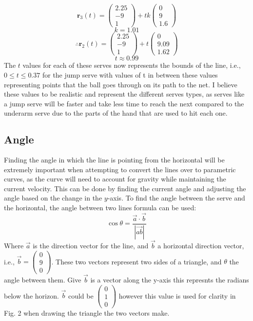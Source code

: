 \documentclass{article}
\begin{document}
										\[\mathbf{r}_3(t) = 
											\begin{pmatrix} 2.25 \\ -9 \\ 1 \end{pmatrix} 
											+ tk \begin{pmatrix} 0 \\ 9 \\ 1.6 \end{pmatrix}\]
											\[k = 1.01\]
											\[\therefore \mathbf{r}_2(t) = 
												\begin{pmatrix} 2.25 \\ -9 \\ 1 \end{pmatrix} 
												+ t \begin{pmatrix} 0 \\ 9.09 \\ 1.62 \end{pmatrix}\]
												\[t \approx 0.99\]
												The \(t\) values for each of these serves now represents the bounds of the line, i.e., \(0 \le t \le 0.37\) for the jump serve with values of t in between these values representing points that the ball goes through on its path to the net. I believe these values to be realistic and represent the different serves types, as serves like a jump serve will be faster and take less time to reach the next compared to the underarm serve due to the parts of the hand that are used to hit each one.


												\subsection*{Angle}

												Finding the angle in which the line is pointing from the horizontal will be extremely important when attempting to convert the lines over to parametric curves, as the curve will need to account for gravity while maintaining the current velocity. This can be done by finding the current angle and adjusting the angle based on the change in the \(y\)-axis. To find the angle between the serve and the horizontal, the angle between two lines formula can be used:
												\[\cos \theta = \frac{\vec{a} \cdot \vec{b}}{|\vec{ab}|}\]
												Where \(\vec{a}\) is the direction vector for the line, and \(\vec{b}\) a horizontal direction vector, i.e., \(\vec{b} = \begin{pmatrix} 0 \\ 9 \\ 0 \end{pmatrix}\). These two vectors represent two sides of a triangle, and \(\theta\) the angle between them. Give \(\vec{b}\) is a vector along the \(\mathrm{y}\)-axis this represnts the radians below the horizon. \(\vec{b}\) could be \(\begin{pmatrix} 0 \\ 1 \\ 0 \end{pmatrix}\) however this value is used for clarity in Fig. 2 when drawing the triangle the two vectors make.
\end{document}
